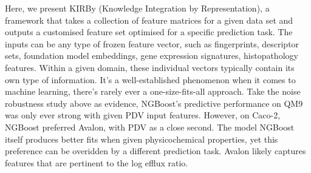 
Here, we present KIRBy (Knowledge Integration by Representation), a framework that takes a collection of feature matrices for a given data set and outputs a customised feature set optimised for a specific prediction task. The inputs can be any type of frozen feature vector, such as fingerprints, descriptor sets, foundation model embeddings, gene expression signatures, histopathology features. Within a given domain, these individual vectors typically contain its own type of information. It's a well-established phenomenon when it comes to machine learning, there's rarely ever a one-size-fits-all approach. Take the noise robustness study above as evidence, NGBoost's predictive performance on QM9 was only ever strong with given PDV input features. However, on Caco-2, NGBoost preferred Avalon, with PDV as a close second. The model NGBoost itself produces better fits when given physicochemical properties, yet this preference can be overidden by a different prediction task. Avalon likely captures features that are pertinent to the log efflux ratio.

